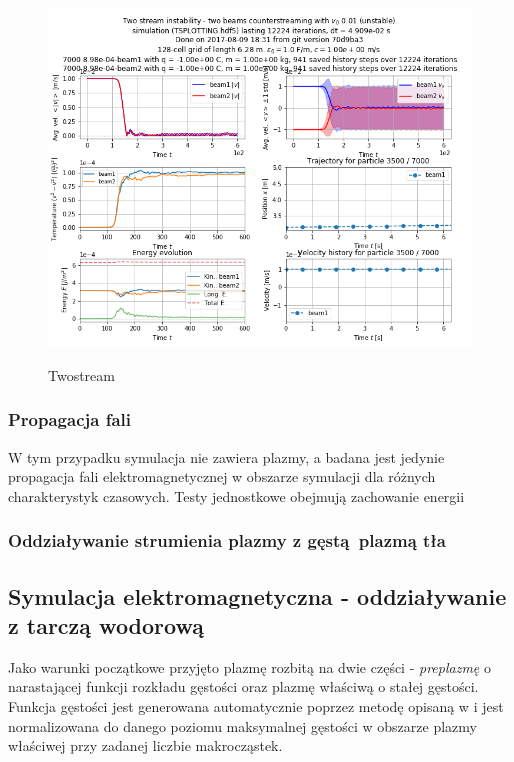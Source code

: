 \begin{figure}[h!]
  \includegraphics[width=\textwidth]{Images/TSPLOTTING}
  \label{fig:twostream}
  \caption{Twostream}
\end{figure}
\subsubsection{Propagacja fali}
W tym przypadku symulacja nie zawiera plazmy, a badana jest jedynie propagacja fali elektromagnetycznej w obszarze
symulacji dla różnych charakterystyk czasowych. %
Testy jednostkowe obejmują zachowanie energii %

\subsubsection{Oddziaływanie strumienia plazmy z gęstą plazmą tła}

    \subsection{Symulacja elektromagnetyczna - oddziaływanie z tarczą wodorową}

    Jako warunki początkowe przyjęto plazmę rozbitą na dwie części - \emph{preplazmę} o narastającej funkcji rozkładu
    gęstości oraz plazmę właściwą o stałej gęstości. Funkcja gęstości jest generowana automatycznie poprzez metodę opisaną
    w %
    i jest normalizowana do danego poziomu maksymalnej gęstości w obszarze plazmy właściwej przy zadanej liczbie makrocząstek.

